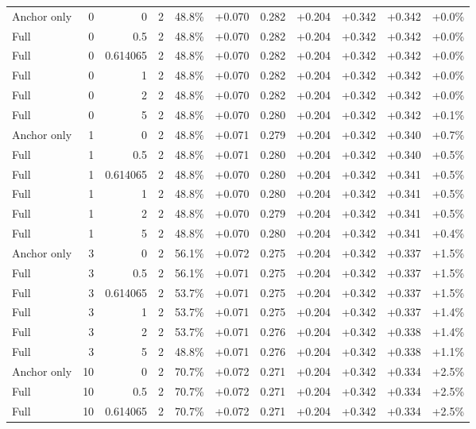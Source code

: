 \begin{table}[htbp]
\begin{tabular}{lrrrccccccc}
Anchor only & 0 & 0 & 2 & 48.8\% & +0.070 & 0.282 & +0.204 & +0.342 & +0.342 & +0.0\% \\
Full & 0 & 0.5 & 2 & 48.8\% & +0.070 & 0.282 & +0.204 & +0.342 & +0.342 & +0.0\% \\
Full & 0 & 0.614065 & 2 & 48.8\% & +0.070 & 0.282 & +0.204 & +0.342 & +0.342 & +0.0\% \\
Full & 0 & 1 & 2 & 48.8\% & +0.070 & 0.282 & +0.204 & +0.342 & +0.342 & +0.0\% \\
Full & 0 & 2 & 2 & 48.8\% & +0.070 & 0.282 & +0.204 & +0.342 & +0.342 & +0.0\% \\
Full & 0 & 5 & 2 & 48.8\% & +0.070 & 0.280 & +0.204 & +0.342 & +0.342 & +0.1\% \\
Anchor only & 1 & 0 & 2 & 48.8\% & +0.071 & 0.279 & +0.204 & +0.342 & +0.340 & +0.7\% \\
Full & 1 & 0.5 & 2 & 48.8\% & +0.071 & 0.280 & +0.204 & +0.342 & +0.340 & +0.5\% \\
Full & 1 & 0.614065 & 2 & 48.8\% & +0.070 & 0.280 & +0.204 & +0.342 & +0.341 & +0.5\% \\
Full & 1 & 1 & 2 & 48.8\% & +0.070 & 0.280 & +0.204 & +0.342 & +0.341 & +0.5\% \\
Full & 1 & 2 & 2 & 48.8\% & +0.070 & 0.279 & +0.204 & +0.342 & +0.341 & +0.5\% \\
Full & 1 & 5 & 2 & 48.8\% & +0.070 & 0.280 & +0.204 & +0.342 & +0.341 & +0.4\% \\
Anchor only & 3 & 0 & 2 & 56.1\% & +0.072 & 0.275 & +0.204 & +0.342 & +0.337 & +1.5\% \\
Full & 3 & 0.5 & 2 & 56.1\% & +0.071 & 0.275 & +0.204 & +0.342 & +0.337 & +1.5\% \\
Full & 3 & 0.614065 & 2 & 53.7\% & +0.071 & 0.275 & +0.204 & +0.342 & +0.337 & +1.5\% \\
Full & 3 & 1 & 2 & 53.7\% & +0.071 & 0.275 & +0.204 & +0.342 & +0.337 & +1.4\% \\
Full & 3 & 2 & 2 & 53.7\% & +0.071 & 0.276 & +0.204 & +0.342 & +0.338 & +1.4\% \\
Full & 3 & 5 & 2 & 48.8\% & +0.071 & 0.276 & +0.204 & +0.342 & +0.338 & +1.1\% \\
Anchor only & 10 & 0 & 2 & 70.7\% & +0.072 & 0.271 & +0.204 & +0.342 & +0.334 & +2.5\% \\
Full & 10 & 0.5 & 2 & 70.7\% & +0.072 & 0.271 & +0.204 & +0.342 & +0.334 & +2.5\% \\
Full & 10 & 0.614065 & 2 & 70.7\% & +0.072 & 0.271 & +0.204 & +0.342 & +0.334 & +2.5\% \\

\end{tabular}
\end{table}
